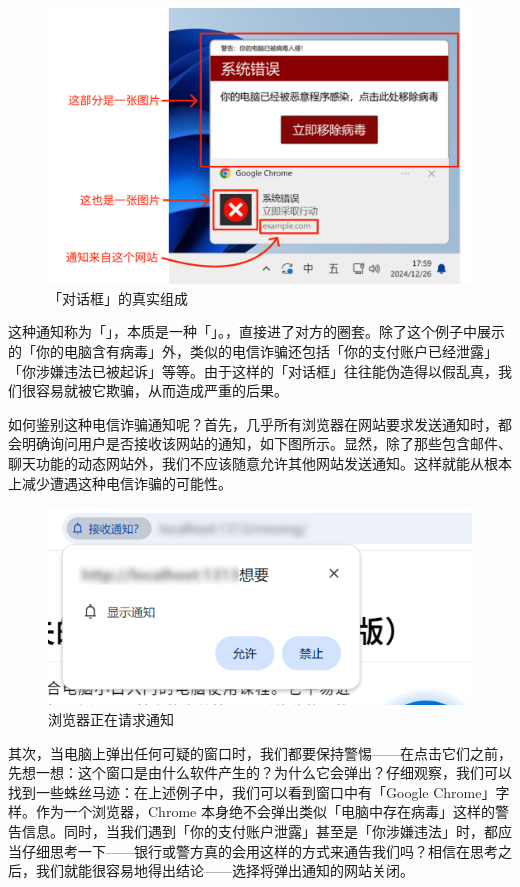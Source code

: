 \begin{figure}[htb!]
  \centering
  \includegraphics[width=.65\textwidth]{assets/basic/Fake_notification_components.png}
  \caption{「对话框」的真实组成}
  \label{fig:Fake_notification_components}
\end{figure}

这种通知称为「」，本质是一种「」。，直接进了对方的圈套。除了这个例子中展示的「你的电脑含有病毒」外，类似的电信诈骗还包括「你的支付账户已经泄露」「你涉嫌违法已被起诉」等等。由于这样的「对话框」往往能伪造得以假乱真，我们很容易就被它欺骗，从而造成严重的后果。

如何鉴别这种电信诈骗通知呢？首先，几乎所有浏览器在网站要求发送通知时，都会明确询问用户是否接收该网站的通知，如下图所示。显然，除了那些包含邮件、聊天功能的动态网站外，我们不应该随意允许其他网站发送通知。这样就能从根本上减少遭遇这种电信诈骗的可能性。

\begin{figure}[htb!]
  \centering
  \includegraphics[width=.55\textwidth]{assets/basic/Website_ask_for_notification_permission.png}
  \caption{浏览器正在请求通知}
  \label{fig:Website_ask_for_notification_permission}
\end{figure}

其次，当电脑上弹出任何可疑的窗口时，我们都要保持警惕——在点击它们之前，先想一想：这个窗口是由什么软件产生的？为什么它会弹出？仔细观察，我们可以找到一些蛛丝马迹：在上述例子中，我们可以看到窗口中有「Google Chrome」字样。作为一个浏览器，Chrome 本身绝不会弹出类似「电脑中存在病毒」这样的警告信息。同时，当我们遇到「你的支付账户泄露」甚至是「你涉嫌违法」时，都应当仔细思考一下——银行或警方真的会用这样的方式来通告我们吗？相信在思考之后，我们就能很容易地得出结论——选择将弹出通知的网站关闭。

